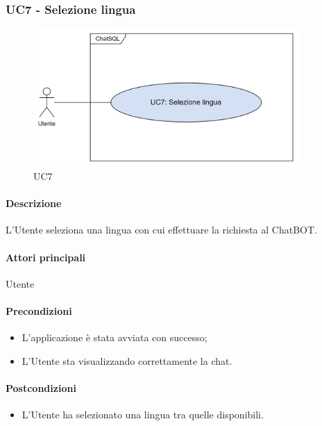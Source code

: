 \subsubsection{UC7 - Selezione lingua}\label{UC7}

\begin{figure}[H]
  \centering
  \includegraphics[width=0.90\textwidth]{assets/uc7.png}
  \caption{UC7}
\end{figure}

\paragraph*{Descrizione}
L'Utente seleziona una lingua con cui effettuare la richiesta al ChatBOT. 

\paragraph*{Attori principali}
Utente

\paragraph*{Precondizioni}
\begin{itemize}
  \item L'applicazione è stata avviata con successo;
  \item L'Utente sta visualizzando correttamente la chat.
\end{itemize}

\paragraph*{Postcondizioni}
\begin{itemize}
  \item L'Utente ha selezionato una lingua tra quelle disponibili.
\end{itemize}

